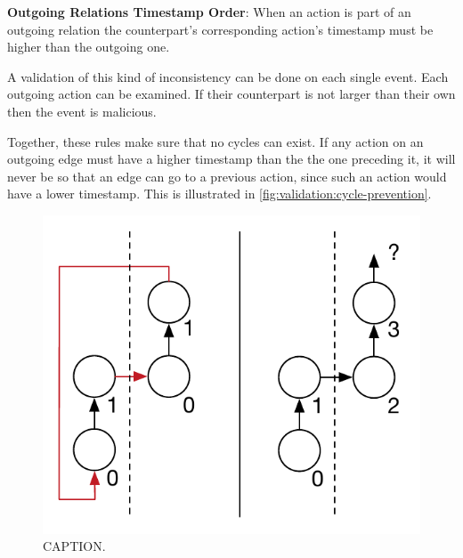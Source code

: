 	\newpar \textbf{Outgoing Relations Timestamp Order}: When an action is part of an outgoing relation the counterpart's corresponding action's timestamp must be higher than the outgoing one.
	
	A validation of this kind of inconsistency can be done on each single event. Each outgoing action can be examined. If their counterpart is not larger than their own then the event is malicious.
	
	\newpar Together, these rules make sure that no cycles can exist. If any action on an outgoing edge must have a higher timestamp than the the one preceding it, it will never be so that an edge can go to a previous action, since such an action would have a lower timestamp. This is illustrated in \autoref{fig:validation:cycle-prevention}.
	
    \begin{figure}[H]
		\centering
		\includegraphics[]{5validation/images/cycle-prevention.pdf}
		\caption{CAPTION.}
		\label{fig:validation:cycle-prevention}
	\end{figure}
	
